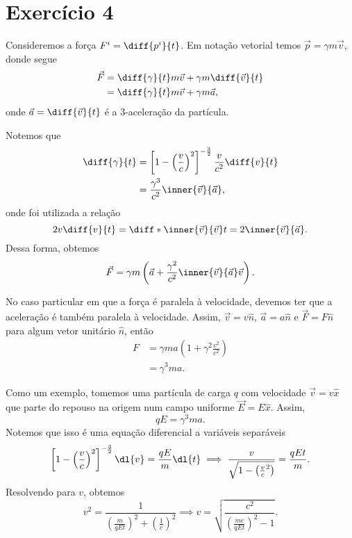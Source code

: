 \section*{Exercício 4}
Consideremos a força \(F^i = \diff{p^i}{t}\). Em notação vetorial temos \(\vec{p} = \gamma m \vec{v}\), donde segue
\begin{align*}
    \vec{F} &= \diff{\gamma}{t} m \vec{v} + \gamma m \diff{\vec{v}}{t}\\
            &= \diff{\gamma}{t}  m \vec{v} + \gamma m\vec{a},
\end{align*}
onde \(\vec{a} = \diff{\vec{v}}{t}\) é a 3-aceleração da partícula.

Notemos que
\begin{align*}
    \diff{\gamma}{t} &= \left[1 - \left(\frac{v}{c}\right)^2\right]^{-\frac32} \frac{v}{c^2}\diff{v}{t}\\
                     &= \frac{\gamma^3}{c^2} \inner{\vec{v}}{\vec{a}},
\end{align*}
onde foi utilizada a relação
\begin{equation*}
    2v\diff{v}{t} = \diff*{\inner{\vec{v}}{\vec{v}}}{t} = 2\inner{\vec{v}}{\vec{a}}.
\end{equation*}
Dessa forma, obtemos
\begin{equation*}
    \vec{F} = \gamma m \left(\vec{a} + \frac{\gamma^2}{c^2}\inner{\vec{v}}{\vec{a}}\vec{v}\right).
\end{equation*}

No caso particular em que a força é paralela à velocidade, devemos ter que a aceleração é também paralela à velocidade. Assim, \(\vec{v} = v \hat{n}\), \(\vec{a} = a\hat{n}\) e \(\vec{F} = F\hat{n}\) para algum vetor unitário \(\hat{n}\), então
\begin{align*}
    F &= \gamma ma \left(1 + \gamma^2\frac{v^2}{c^2}\right)\\
      &= \gamma^3 ma.
\end{align*}

Como um exemplo, tomemos uma partícula de carga \(q\) com velocidade \(\vec{v} = v\hat{x}\) que parte do repouso na origem num campo uniforme \(\vec{E} = E\hat{x}\). Assim,
\begin{equation*}
    qE = \gamma^3 ma.
\end{equation*}
Notemos que isso é uma equação diferencial a variáveis separáveis
\begin{equation*}
    \left[1 - \left(\frac{v}{c}\right)^2\right]^{-\frac32}\dl{v} = \frac{qE}{m} \dl{t} \implies \frac{v}{\sqrt{1 - \left(\frac{v}{c}^2\right)}} = \frac{qEt}{m}.
\end{equation*}
Resolvendo para \(v\), obtemos
\begin{equation*}
    v^2 = \frac{1}{\left(\frac{m}{qEt}\right)^2 + \left(\frac{1}{c}\right)^2} \implies v = \sqrt{\frac{c^2}{\left(\frac{mc}{qEt}\right)^2 - 1}}.
\end{equation*}

